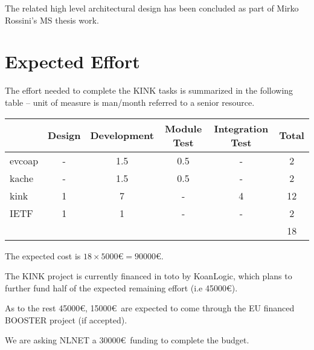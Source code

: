 \documentclass[12pt]{article}
\begin{document}
The related high level architectural design has been concluded as part of Mirko Rossini's MS thesis work.

\section{Expected Effort}
The effort needed to complete the KINK tasks is summarized in the following table -- unit of measure is man/month referred to a senior resource.

\begin{center}
\begin{tabular}{|l|c|c|c|c|c|}
	\hline 
	  & Design & Development & Module Test & Integration Test & Total \\
	\hline 
	evcoap & - & 1.5 & 0.5 & - & 2 \\
	\hline
	kache & - & 1.5 & 0.5 & - & 2 \\
	\hline
	kink & 1 & 7 & - & 4 & 12 \\
	\hline
	IETF & 1 & 1 & - & - & 2 \\
	\hline
	\multicolumn{5}{|c|}{} & 18 \\
	\hline
\end{tabular}
\end{center}

The expected cost is $18 \times 5000$\euro $= 90000$\euro. 

The KINK project is currently financed in toto by KoanLogic, which plans to further fund half of the expected remaining effort (i.e 45000\euro).

As to the rest 45000\euro, 15000\euro~are expected to come through the EU financed BOOSTER project (if accepted).

We are asking NLNET a 30000\euro~funding to complete the budget.
\end{document}
